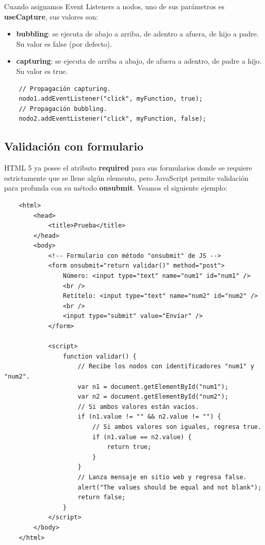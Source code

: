 Cuando asignamos Event Listeners a nodos, uno de sus parámetros es \textbf{useCapture}, sus valores son:
\begin{itemize}
    \item \textbf{bubbling}: se ejecuta de abajo a arriba, de adentro a afuera, de hijo a padre. Su valor es false (por defecto).
    \item \textbf{capturing}: se ejecuta de arriba a abajo, de afuera a adentro, de padre a hijo. Su valor es true.
\end{itemize}
\begin{lstlisting}
    // Propagación capturing.
    nodo1.addEventListener("click", myFunction, true); 
    // Propagación bubbling.
    nodo2.addEventListener("click", myFunction, false);
\end{lstlisting}


\subsection{Validación con formulario}

HTML 5 ya posee el atributo \textbf{required} para sus formularios donde se requiere estrictamente que se llene algún elemento, pero JavaScript permite validación para profunda con su método \textbf{onsubmit}. Veamos el siguiente ejemplo:
\begin{lstlisting}
    <html>
        <head>
            <title>Prueba</title>
        </head>
        <body>
            <!-- Formulario con método "onsubmit" de JS -->
            <form onsubmit="return validar()" method="post">
                Número: <input type="text" name="num1" id="num1" />
                <br />
                Retítelo: <input type="text" name="num2" id="num2" />
                <br />
                <input type="submit" value="Envíar" />
            </form>
            
            <script>
                function validar() {
                    // Recibe los nodos con identificadores "num1" y "num2".
                    var n1 = document.getElementById("num1");
                    var n2 = document.getElementById("num2");
                    // Si ambos valores están vacíos.
                    if (n1.value != "" && n2.value != "") {
                        // Si ambos valores son iguales, regresa true.
                        if (n1.value == n2.value) {
                            return true;
                        }
                    }
                    // Lanza mensaje en sitio web y regresa false.
                    alert("The values should be equal and not blank");
                    return false;
                }
            </script>
        </body>
    </html>
\end{lstlisting}

